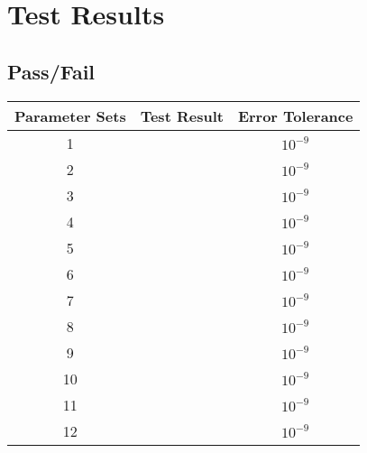 


\section{Test Results}

\subsection{Pass/Fail}

\begin{center}
	\begin{tabular}{|c|c|c|}
		\hline
		Parameter Sets & Test Result & Error Tolerance \\ \hline \hline
		1  & & $10^{-9}$ \\ \hline
		2  & & $10^{-9}$ \\ \hline
		3  & & $10^{-9}$ \\ \hline
		4  && $10^{-9}$ \\ \hline
		5  && $10^{-9}$ \\ \hline
		6  &  & $10^{-9}$ \\ \hline
		7  && $10^{-9}$ \\ \hline
		8  & & $10^{-9}$ \\ \hline
		9  & & $10^{-9}$ \\ \hline
		10  && $10^{-9}$ \\ \hline
		11  & & $10^{-9}$ \\ \hline
		12  & & $10^{-9}$ \\ 
		\hline
		
	\end{tabular}
\end{center}

